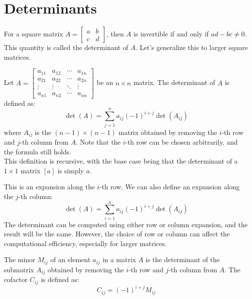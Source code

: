 \chapter{Determinants}
For a square matrix \(A = \begin{bmatrix}
    a & b \\
    c & d
\end{bmatrix}\), then $A$ is invertible if and only if \(ad - bc \neq 0\). This quantity is called the determinant of $A$. Let's generalize this to larger square matrices.
\begin{definition}[Determinant]
    Let $A = \begin{bmatrix}
        a_{11} & a_{12} & \cdots & a_{1n} \\
        a_{21} & a_{22} & \cdots & a_{2n} \\
        \vdots & \vdots & \ddots & \vdots \\
        a_{n1} & a_{n2} & \cdots & a_{nn}
    \end{bmatrix}$ be an \(n \times n\) matrix. The determinant of $A$ is defined as:
    \[
        \det(A) = \sum_{j = 1}^{n} a_{ij} (-1)^{i+j} \det(A_{ij})
    \]
    where \(A_{ij}\) is the \((n-1) \times (n-1)\) matrix obtained by removing the \(i\)-th row and \(j\)-th column from $A$. Note that the $i$-th row can be chosen arbitrarily, and the formula still holds. \\ 
    This definition is recursive, with the base case being that the determinant of a \(1 \times 1\) matrix \([a]\) is simply \(a\).
\end{definition}
This is an expansion along the \(i\)-th row. We can also define an expansion along the \(j\)-th column:
\[
    \det(A) = \sum_{i = 1}^{n} a_{ij} (-1)^{i+j} \det(A_{ij})
\]
The determinant can be computed using either row or column expansion, and the result will be the same. However, the choice of row or column can affect the computational efficiency, especially for larger matrices.


\begin{definition}
    The minor \(M_{ij}\) of an element \(a_{ij}\) in a matrix $A$ is the determinant of the submatrix \(A_{ij}\) obtained by removing the \(i\)-th row and \(j\)-th column from $A$. The cofactor \(C_{ij}\) is defined as:
    \[
        C_{ij} = (-1)^{i+j} M_{ij}
    \]
\end{definition}

